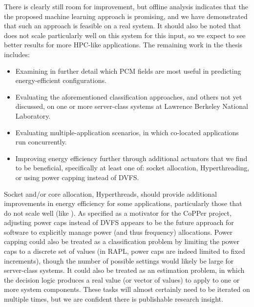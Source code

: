 There is clearly still room for improvement, but offline analysis indicates that the the proposed machine learning approach is promising, and we have demonstrated that such an approach is feasible on a real system.
It should also be noted that  does not scale particularly well on this system for this input, so we expect to see better results for more HPC-like applications.
The remaining work in the thesis includes:
\begin{itemize}
\item Examining in further detail which PCM fields are most useful in predicting energy-efficient configurations.
\item Evaluating the aforementioned classification approaches, and others not yet discussed, on one or more server-class systems at Lawrence Berkeley National Laboratory.
\item Evaluating multiple-application scenarios, in which co-located applications run concurrently.
\item Improving energy efficiency further through additional actuators that we find to be beneficial, specifically at least one of: socket allocation, Hyperthreading, or using power capping instead of DVFS.
\end{itemize}
Socket and/or core allocation, \eg Hyperthreads, should provide additional improvements in energy efficiency for some applications, particularly those that do not scale well (like ).
As specified as a motivator for the CoPPer project, adjusting power caps instead of DVFS appears to be the future approach for software to explicitly manage power (and thus frequency) allocations.
Power capping could also be treated as a classification problem by limiting the power caps to a discrete set of values (\eg in RAPL, power caps are indeed limited to fixed increments), though the number of possible settings would likely be large for server-class systems.
It could also be treated as an estimation problem, in which the decision logic produces a real value (or vector of values) to apply to one or more system components.
These tasks will almost certainly need to be iterated on multiple times, but we are confident there is publishable research insight.



